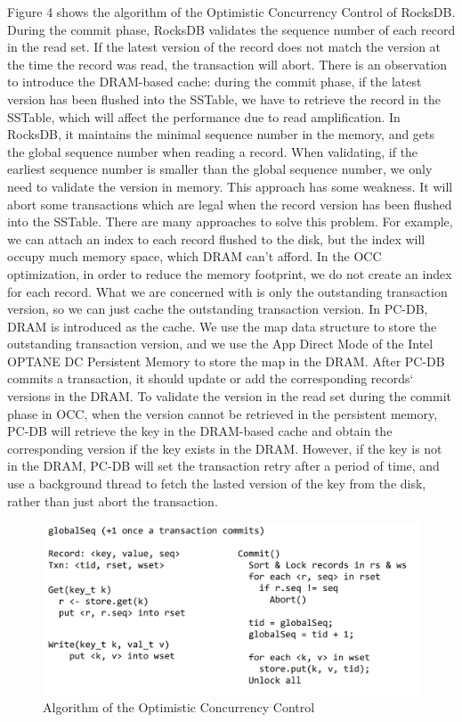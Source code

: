 Figure 4 shows the algorithm of the Optimistic Concurrency Control of RocksDB. During the commit phase, RocksDB validates the sequence number of each record in the read set. If the latest version of the record does not match the version at the time the record was read, the transaction will abort. There is an observation to introduce the DRAM-based cache: during the commit phase, if the latest version has been flushed into the SSTable, we have to retrieve the record in the SSTable, which will affect the performance due to read amplification. In RocksDB, it maintains the minimal sequence number in the memory, and gets the global sequence number when reading a record. When validating, if the earliest sequence number is smaller than the global sequence number, we only need to validate the version in memory. This approach has some weakness. It will abort some transactions which are legal when the record version has been flushed into the SSTable. There are many approaches to solve this problem. For example, we can attach an index to each record flushed to the disk, but the index will occupy much memory space, which DRAM can't afford. In the OCC optimization, in order to reduce the memory footprint, we do not create an index for each record. What we are concerned with is only the outstanding transaction version, so we can just cache the outstanding transaction version. In PC-DB, DRAM is introduced as the cache. We use the map data structure to store the outstanding transaction version, and we use the App Direct Mode of the Intel OPTANE DC Persistent Memory to store the map in the DRAM. After PC-DB commits a transaction, it should update or add the corresponding records` versions in the DRAM. To validate the version in the read set during the commit phase in OCC, when the version cannot be retrieved in the persistent memory, PC-DB will retrieve  the key in the  DRAM-based cache and obtain the corresponding version if the key exists in the DRAM. However, if the key is not in the DRAM, PC-DB will set the transaction retry after a period of time, and use a background thread to fetch the lasted version of the key from the disk, rather than just abort the transaction. 
\begin{figure}
    \centering
    \includegraphics[width=0.36\paperwidth]{USENIX/figure/algorithm.png}
    \caption{Algorithm of the Optimistic Concurrency Control}
    \label{fig:OCCValidation}
\end{figure}